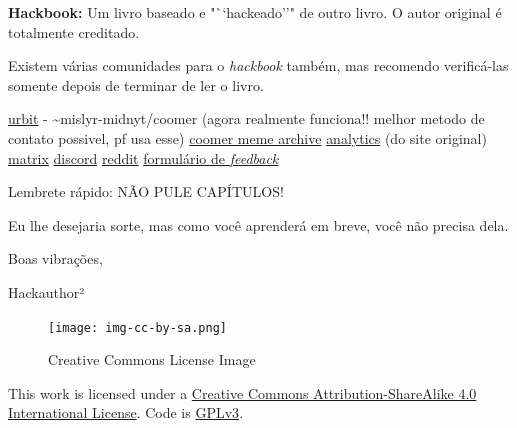 \documentclass[
  spanish,
  openany]{book}
\let\oldhref\href
\renewcommand{\href}[2]{\textcolor{linkcolor}{\oldhref{#1}{#2}}}
\begin{document}
{\textbf{Hackbook:} Um livro baseado e "``hackeado''" de outro livro. O autor original é totalmente creditado. }

Existem várias comunidades para o \emph{hackbook} também, mas recomendo verificá-las somente depois de terminar de ler o livro.

\href{https://urbit.org}{urbit} - \textasciitilde mislyr-midnyt/coomer (agora realmente funciona!! melhor metodo de contato possivel, pf usa esse) \textbar{} \href{https://coomer.org}{coomer meme archive} \textbar{} \href{https://plausible.io/easypeasymethod.org}{analytics} (do site original) \textbar{} \href{https://matrix.to/\#/!xmJZznbJXuwzEGSEti:matrix.org?via=matrix.org}{matrix} \textbar{} \href{https://discord.com/invite/bCXEnf9}{discord} \textbar{} \href{https://reddit.com/r/pmohackbook}{reddit} \textbar{} \href{https://forms.gle/p7cTxowaNpKqgi5Z7}{formulário de \emph{feedback}}

Lembrete rápido: NÃO PULE CAPÍTULOS!

Eu lhe desejaria sorte, mas como você aprenderá em breve, você não precisa dela.

Boas vibrações,

Hackauthor²

\begin{figure}
\centering
\texttt{[image: img-cc-by-sa.png]}
\caption{Creative Commons License Image}
\end{figure}

This work is licensed under a \href{https://creativecommons.org/licenses/by-sa/4.0/}{Creative Commons Attribution-ShareAlike 4.0 International License}. Code is \href{https://gitlab.com/snuggy/easypeasy/-/blob/master/LICENSE}{GPLv3}.
\end{document}
